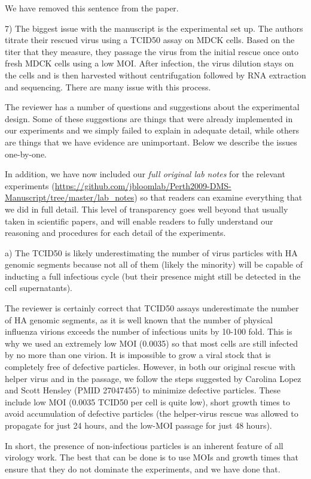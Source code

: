 \documentclass[11pt, oneside]{article}   	%
\newcommand{\response}[1]{{\color{black}#1}}
\begin{document}
\response{We have removed this sentence from the paper.}

7) The biggest issue with the manuscript is the experimental set up. The authors titrate their rescued virus using a TCID50 assay on MDCK cells. Based on the titer that they measure, they passage the virus from the initial rescue once onto fresh MDCK cells using a low MOI. After infection, the virus dilution stays on the cells and is then harvested without centrifugation followed by RNA extraction and sequencing. There are many issue with this process. 

\response{The reviewer has a number of questions and suggestions about the experimental design.
Some of these suggestions are things that were already implemented in our experiments and we simply failed to explain in adequate detail, while others are things that we have evidence are unimportant. 
Below we describe the issues one-by-one.

In addition, we have now included our \emph{full original lab notes} for the relevant experiments (\url{https://github.com/jbloomlab/Perth2009-DMS-Manuscript/tree/master/lab_notes}) so that readers can examine everything that we did in full detail.
This level of transparency goes well beyond that usually taken in scientific papers, and will enable readers to fully understand our reasoning and procedures for each detail of the experiments.
}

a) The TCID50 is likely underestimating the number of virus particles with HA genomic segments because not all of them (likely the minority) will be capable of inducting a full infectious cycle (but their presence might still be detected in the cell supernatants). 

\response{The reviewer is certainly correct that TCID50 assays underestimate the number of HA genomic segments, as it is well known that the number of physical influenza virions exceeds the number of infectious units by 10-100 fold.
This is why we used an extremely low MOI (0.0035) so that most cells are still infected by no more than one virion.
It is impossible to grow a viral stock that is completely free of defective particles.
However, in both our original rescue with helper virus and in the passage, we follow the steps suggested by Carolina Lopez and Scott Hensley (PMID 27047455) to minimize defective particles.
These include low MOI (0.0035 TCID50 per cell is quite low), short growth times to avoid accumulation of defective particles (the helper-virus rescue was allowed to propagate for just 24 hours, and the low-MOI passage for just 48 hours).

In short, the presence of non-infectious particles is an inherent feature of all virology work.
The best that can be done is to use MOIs and growth times that ensure that they do not dominate the experiments, and we have done that.
}
\end{document}
